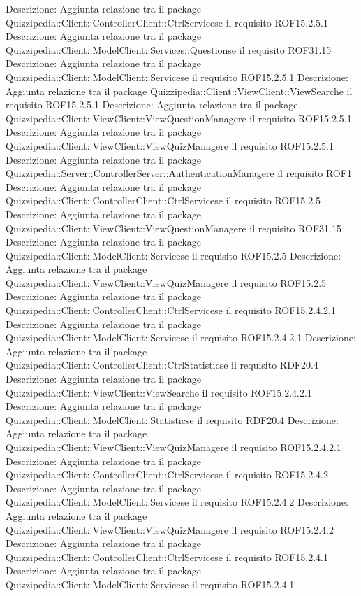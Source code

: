 Descrizione: Aggiunta relazione tra il package Quizzipedia::Client::ControllerClient::CtrlServicese il requisito ROF15.2.5.1 
Descrizione: Aggiunta relazione tra il package Quizzipedia::Client::ModelClient::Services::Questionse il requisito ROF31.15 
Descrizione: Aggiunta relazione tra il package Quizzipedia::Client::ModelClient::Servicese il requisito ROF15.2.5.1 
Descrizione: Aggiunta relazione tra il package Quizzipedia::Client::ViewClient::ViewSearche il requisito ROF15.2.5.1 
Descrizione: Aggiunta relazione tra il package Quizzipedia::Client::ViewClient::ViewQuestionManagere il requisito ROF15.2.5.1 
Descrizione: Aggiunta relazione tra il package Quizzipedia::Client::ViewClient::ViewQuizManagere il requisito ROF15.2.5.1 
Descrizione: Aggiunta relazione tra il package Quizzipedia::Server::ControllerServer::AuthenticationManagere il requisito ROF1 
Descrizione: Aggiunta relazione tra il package Quizzipedia::Client::ControllerClient::CtrlServicese il requisito ROF15.2.5 
Descrizione: Aggiunta relazione tra il package Quizzipedia::Client::ViewClient::ViewQuestionManagere il requisito ROF31.15 
Descrizione: Aggiunta relazione tra il package Quizzipedia::Client::ModelClient::Servicese il requisito ROF15.2.5 
Descrizione: Aggiunta relazione tra il package Quizzipedia::Client::ViewClient::ViewQuizManagere il requisito ROF15.2.5 
Descrizione: Aggiunta relazione tra il package Quizzipedia::Client::ControllerClient::CtrlServicese il requisito ROF15.2.4.2.1 
Descrizione: Aggiunta relazione tra il package Quizzipedia::Client::ModelClient::Servicese il requisito ROF15.2.4.2.1 
Descrizione: Aggiunta relazione tra il package Quizzipedia::Client::ControllerClient::CtrlStatisticse il requisito RDF20.4 
Descrizione: Aggiunta relazione tra il package Quizzipedia::Client::ViewClient::ViewSearche il requisito ROF15.2.4.2.1 
Descrizione: Aggiunta relazione tra il package Quizzipedia::Client::ModelClient::Statisticse il requisito RDF20.4 
Descrizione: Aggiunta relazione tra il package Quizzipedia::Client::ViewClient::ViewQuizManagere il requisito ROF15.2.4.2.1 
Descrizione: Aggiunta relazione tra il package Quizzipedia::Client::ControllerClient::CtrlServicese il requisito ROF15.2.4.2 
Descrizione: Aggiunta relazione tra il package Quizzipedia::Client::ModelClient::Servicese il requisito ROF15.2.4.2 
Descrizione: Aggiunta relazione tra il package Quizzipedia::Client::ViewClient::ViewQuizManagere il requisito ROF15.2.4.2 
Descrizione: Aggiunta relazione tra il package Quizzipedia::Client::ControllerClient::CtrlServicese il requisito ROF15.2.4.1 
Descrizione: Aggiunta relazione tra il package Quizzipedia::Client::ModelClient::Servicese il requisito ROF15.2.4.1 
